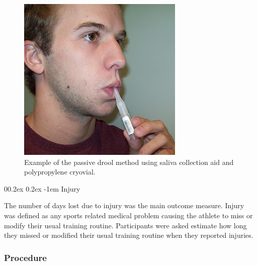\documentclass[
  english,
  man,floatsintext]{apa6}
\makeatletter
\renewcommand{\paragraph}{\@startsection{paragraph}{4}{\parindent}%
  {0\baselineskip \@plus 0.2ex \@minus 0.2ex}%
  {-1em}%
  {\normalfont\normalsize\bfseries\itshape\typesectitle}}
\makeatother
\begin{document}
\begin{figure}

{\centering \includegraphics[width=1\linewidth]{figs/measures/pd} 

}

\caption{Example of the passive drool method using saliva collection aid and polypropylene cryovial.}\label{fig:passivedrool}
\end{figure}

\hypertarget{injury-1}{%
\paragraph{Injury}\label{injury-1}}

The number of days lost due to injury was the main outcome measure.
Injury was defined as any sports related medical problem causing the athlete to miss or modify their usual training routine.
Participants were asked estimate how long they missed or modified their usual training routine when they reported injuries.

\hypertarget{procedure-1}{%
\subsubsection{Procedure}\label{procedure-1}}
\end{document}
